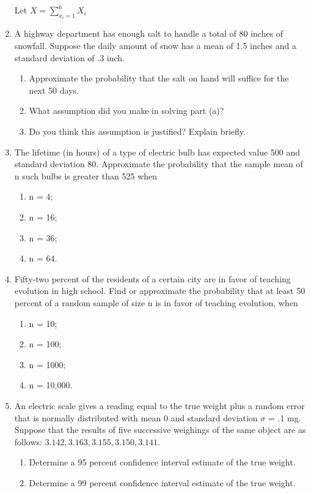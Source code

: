 \documentclass{article}
\begin{document}
\begin{enumerate}
    Let $X = \displaystyle \sum_{x_i = 1}^6 {X_i}$
    \item A highway department has enough salt to handle a total of 80 inches of snowfall. Suppose the daily amount of snow has a mean of 1.5 inches and a standard deviation of .3 inch.
    \begin{enumerate}
        \item Approximate the probability that the salt on hand will suffice for the next 50 days.
        \item What assumption did you make in solving part (a)?
        \item Do you think this assumption is justified? Explain briefly.
    \end{enumerate}
    \item  The lifetime (in hours) of a type of electric bulb has expected value 500 and standard deviation 80. 
    Approximate the probability that the sample mean of n such bulbs is greater than 525 when
    \begin{enumerate}
        \item n = 4;
        \item n = 16;
        \item n = 36;
        \item n = 64.
    \end{enumerate}
    \item Fifty-two percent of the residents of a certain city are in favor of teaching evolution in high school. Find or approximate the probability that at least 50 percent of a random sample of size n is in favor of teaching evolution, when
    \begin{enumerate}
        \item n = 10;
        \item n = 100;
        \item n = 1000;
        \item n = 10,000.
    \end{enumerate}
    \item An electric scale gives a reading equal to the true weight plus a random error that is normally distributed with mean 0 and standard deviation $\sigma$ = .1 mg. Suppose that the results of five successive weighings of the same object are as follows: $3.142, 3.163, 3.155, 3.150, 3.141$.
    \begin{enumerate}
        \item Determine a 95 percent confidence interval estimate of the true weight.
        \item Determine a 99 percent confidence interval estimate of the true weight.

\end{enumerate}
\end{enumerate}
\end{document}
